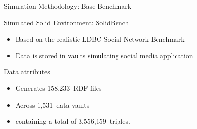 \begin{frame}{Simulation Methodology: Base Benchmark}
  \begin{block}{Simulated Solid Environment: SolidBench \parencite{taelman2023link}}
    \begin{itemize}
        \item Based on the realistic LDBC Social Network Benchmark
        \item Data is stored in vaults simulating social media application
    \end{itemize}
  \end{block}
  \begin{block}{Data attributes}
        \begin{itemize}
            \item Generates 158,233~RDF files 
            \item Across 1,531~data vaults
            \item containing a total of 3,556,159~triples.
    \end{itemize}
  \end{block}
\end{frame}

